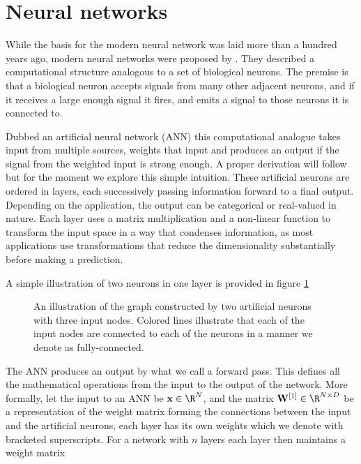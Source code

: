 
\section{Neural networks}\label{sec:ANN}

While the basis for the modern neural network was laid more than a hundred years ago, modern neural networks were proposed by \citet{McCulloch1943}. They described a computational structure analogous to a set of biological neurons. The premise is that a biological neuron accepts signals from many other adjacent neurons, and if it receives a large enough signal it fires, and emits a signal to those neurons it is connected to.  

Dubbed an artificial neural network (ANN) this computational analogue takes input from multiple sources, weights that input and produces an output if the signal from the weighted input is strong enough. A proper derivation will follow but for the moment we explore this simple intuition. These artificial neurons are ordered in layers, each successively passing information forward to a final output. Depending on the application, the output can be categorical or real-valued in nature. Each layer uses a matrix multiplication and a non-linear function to transform the input space in a way that condenses information, as most applications use transformations that reduce the dimensionality substantially before making a prediction.

A simple illustration of two neurons in one layer is provided in figure \ref{fig:ann_illustration} 



\begin{figure}[h]
\centering

\caption[Fully connected neural network illustration]{An illustration of the graph constructed by two artificial neurons with three input nodes. Colored lines illustrate that  each of the input nodes are connected to each of the neurons in a manner we denote as fully-connected.}\label{fig:ann_illustration}
\end{figure}


\noindent The ANN produces an output by what we call a forward pass. This defines all the mathematical operations from the input to the output of the network. More formally, let the input to an ANN be $\mathbf{x} \in \R^N$, and the matrix $\mathbf{W}^{[1]} \in \R^{N \times D}$ be a representation of the weight matrix forming the connections between the input and the artificial neurons, each layer has its own weights which we denote with bracketed superscripts. For a network with $n$ layers each layer then maintains a weight matrix 

